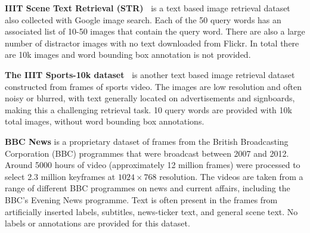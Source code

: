 \documentclass[twocolumn]{svjour3}          \smartqed  \usepackage{epsfig}
\begin{document}
{\bf IIIT Scene Text Retrieval (STR)~\cite{Mishra13}}
is a text based image retrieval dataset also collected with Google image search. Each of the 50 query words has an associated list of 10-50 images that contain the query word. There are also a large number of distractor images with no text downloaded from Flickr. In total there are 10k images and word bounding box annotation is not provided.

{\bf The IIIT Sports-10k dataset~\cite{Mishra13}}
is another text based image retrieval dataset constructed from frames of sports video. The images are low resolution and often noisy or blurred, with text generally located on advertisements and signboards, making this a challenging retrieval task. 10 query words are provided with 10k total images, without word bounding box annotations.

{\bf BBC News}
is a proprietary dataset of frames from the British Broadcasting Corporation (BBC) programmes that were broadcast between 2007 and 2012. Around 5000 hours of video (approximately 12 million frames) were processed to select 2.3 million keyframes at $1024 \times 768$ resolution. The videos are taken from a range of different BBC programmes on news and current affairs, including the BBC's Evening News programme. Text is often present in the frames from artificially inserted labels, subtitles, news-ticker text, and general scene text. No labels or annotations are provided for this dataset.
\end{document}
